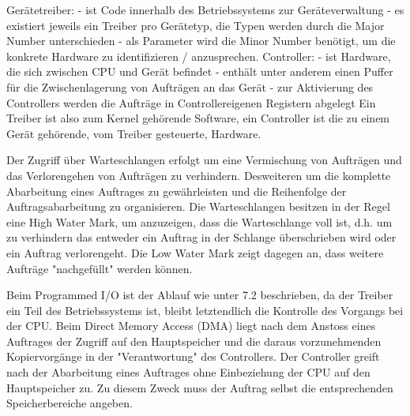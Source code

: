 \begin{answer}
Gerätetreiber:
- ist Code innerhalb des Betriebssystems zur Geräteverwaltung
- es existiert jeweils ein Treiber pro Gerätetyp, die Typen werden durch die Major Number unterschieden
- als Parameter wird die Minor Number benötigt, um die konkrete Hardware zu identifizieren /
anzusprechen. Controller:
- ist Hardware, die sich zwischen CPU und Gerät befindet
- enthält unter anderem einen Puffer für die Zwischenlagerung von Aufträgen an das Gerät
- zur Aktivierung des Controllers werden die Aufträge in Controllereigenen Registern abgelegt
Ein Treiber ist also zum Kernel gehörende Software, ein Controller ist die zu einem Gerät gehörende,
vom Treiber gesteuerte, Hardware.
\end{answer}

\begin{answer}
Der Zugriff über Warteschlangen erfolgt um eine Vermischung von Aufträgen und das Verlorengehen von Aufträgen zu verhindern. Desweiteren um die komplette Abarbeitung eines Auftrages zu gewährleisten und die Reihenfolge der Auftragsabarbeitung zu organisieren.
Die Warteschlangen besitzen in der Regel eine High Water Mark, um anzuzeigen, dass die Warteschlange voll ist, d.h. um zu verhindern das entweder ein Auftrag in der Schlange überschrieben wird oder ein Auftrag verlorengeht. Die Low Water Mark zeigt dagegen an, dass weitere Aufträge "nachgefüllt" werden können.
\end{answer}

\begin{answer}
Beim Programmed
I/O ist der Ablauf wie unter 7.2 beschrieben, da der Treiber ein Teil des Betriebssystems ist, bleibt letztendlich die Kontrolle des Vorgangs bei der CPU. Beim Direct Memory Access (DMA) liegt nach dem Anstoss eines Auftrages der Zugriff auf den
Hauptspeicher und die daraus vorzunehmenden Kopiervorgänge in der "Verantwortung" des Controllers.
Der Controller greift nach der Abarbeitung eines Auftrages ohne Einbeziehung der CPU
auf den Hauptspeicher zu. Zu diesem Zweck muss der Auftrag selbst die entsprechenden Speicherbereiche
angeben.
\end{answer}

